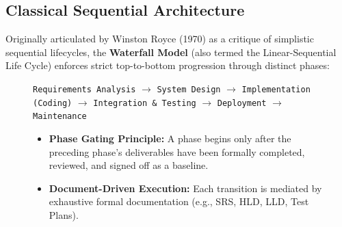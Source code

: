 \subsection{Classical Sequential Architecture}
Originally articulated by Winston Royce (1970) as a critique of simplistic sequential lifecycles, the \textbf{Waterfall Model} (also termed the Linear-Sequential Life Cycle) enforces strict top-to-bottom progression through distinct phases:
\begin{figure}[htbp]
\centering
\begin{tcolorbox}[colback=codebg, colframe=primary, title=\textbf{The Classical Waterfall Phase Pipeline}]
\begin{center}
\texttt{Requirements Analysis} $\longrightarrow$ \texttt{System Design} $\longrightarrow$ \texttt{Implementation (Coding)} $\longrightarrow$ \texttt{Integration \& Testing} $\longrightarrow$ \texttt{Deployment} $\longrightarrow$ \texttt{Maintenance}
\end{center}
\begin{itemize}
    \item \textbf{Phase Gating Principle:} A phase begins only after the preceding phase's deliverables have been formally completed, reviewed, and signed off as a baseline.
    \item \textbf{Document-Driven Execution:} Each transition is mediated by exhaustive formal documentation (e.g., SRS, HLD, LLD, Test Plans).
\end{itemize}
\end{tcolorbox}
\end{figure}

